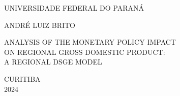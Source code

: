 \documentclass[../thesis.tex]{subfiles}
\begin{document}
	
	\begin{center}
	
	
	UNIVERSIDADE FEDERAL DO PARANÁ
	
	\vspace*{2cm}
	
	ANDRÉ LUIZ BRITO
	
	\vspace*{5cm}
	
	ANALYSIS OF THE MONETARY POLICY IMPACT \\
	ON REGIONAL GROSS DOMESTIC PRODUCT: \\
	A REGIONAL DSGE MODEL


	\vfill
	
	CURITIBA \\	
	2024
	
	\vspace*{1cm}
	
	\end{center}
	
	\thispagestyle{empty}
	
	\newpage
	
\end{document}
